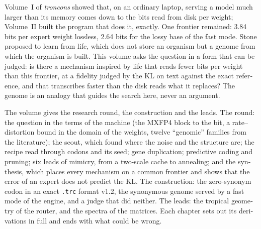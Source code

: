 \begin{otherlanguage}{english}
Volume~I of \emph{troncons} showed that, on an ordinary laptop, serving a model much larger than its memory comes down to the bits read from disk per weight; Volume~II built the program that does it, exactly. One frontier remained: 3.84 bits per expert weight lossless, 2.64 bits for the lossy base of the fast mode. Stone proposed to learn from life, which does not store an organism but a genome from which the organism is built. This volume asks the question in a form that can be judged: is there a mechanism inspired by life that reads fewer bits per weight than this frontier, at a fidelity judged by the KL on text against the exact reference, and that transcribes faster than the disk reads what it replaces? The genome is an analogy that guides the search here, never an argument.

The volume gives the research round, the construction and the leads. The round: the question in the terms of the machine (the MXFP4 block to the bit, a rate--distortion bound in the domain of the weights, twelve ``genomic'' families from the literature); the scout, which found where the noise and the structure are; the recipe read through codons and its seed; gene duplication; predictive coding and pruning; six leads of mimicry, from a two-scale cache to annealing; and the synthesis, which places every mechanism on a common frontier and shows that the error of an expert does not predict the KL. The construction: the zero-synonym codon in an exact \texttt{.trc} format v1.2, the synonymous genome served by a fast mode of the engine, and a judge that did neither. The leads: the tropical geometry of the router, and the spectra of the matrices. Each chapter sets out its derivations in full and ends with what could be wrong.


\end{otherlanguage}
